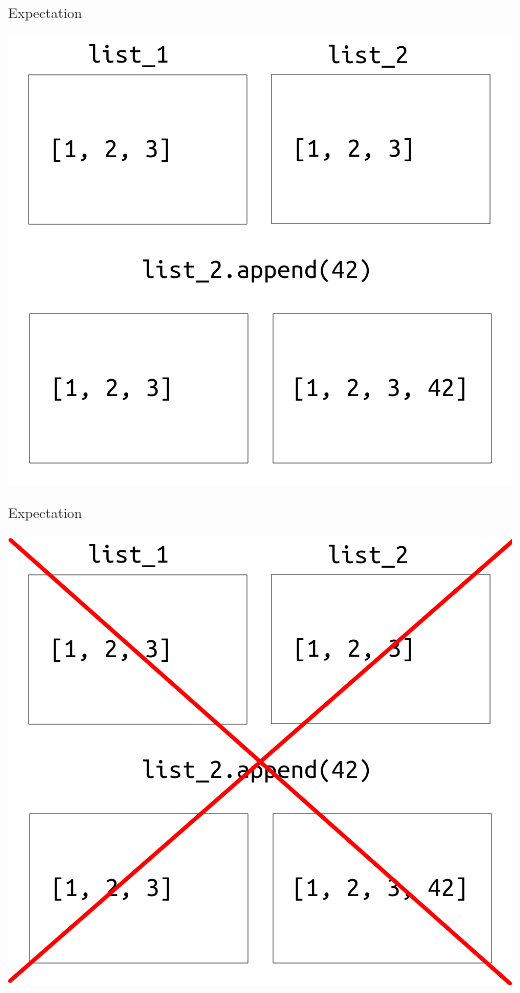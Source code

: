 \begin{frame}{Expectation}

    \begin{center}
        \includegraphics[height=0.8\textheight]{09_OOP/container_model.png}
    \end{center}

\end{frame}

\begin{frame}{Expectation}

    \begin{center}
        \includegraphics[height=0.8\textheight]{09_OOP/container_model_X.png}
    \end{center}

\end{frame}

